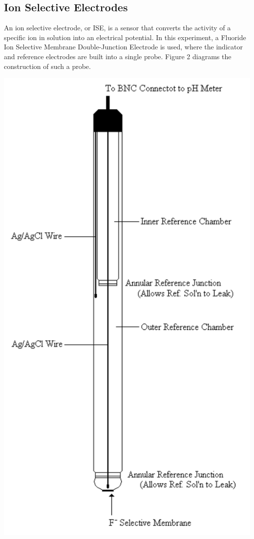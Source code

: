 \documentclass{article}
\begin{document}
\subsection {Ion Selective Electrodes}
An ion selective electrode, or ISE, is a sensor that converts the activity of a specific ion in solution into
an electrical potential.
In this experiment, a Fluoride Ion Selective Membrane Double-Junction Electrode
is used, where the indicator and reference electrodes are built into a single
probe. Figure 2 diagrams the construction of such a probe. \cite{nmt}
\begin{center}
    \includegraphics[scale=0.5]{probe}
\end{center}
\end{document}
